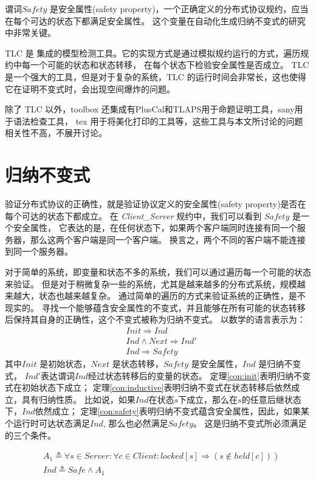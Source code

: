 谓词$Safety$ 是安全属性(safety property)，一个正确定义的分布式协议规约，应当在每个可达的状态下都满足安全属性。
这个变量在自动化生成归纳不变式的研究中非常关键。

TLC 是 \TLA 集成的模型检测工具。它的实现方式是通过模拟规约运行的方式，遍历规约中每一个可能的状态和状态转移，
在每个状态下检验安全属性是否成立。
TLC 是一个强大的工具，但是对于复杂的系统，TLC 的运行时间会非常长，这也使得它在证明不变式时，会出现空间爆炸的问题。

除了 TLC 以外，\TLA toolbox\cite{tla+toolbox} 还集成有PlusCal和TLAPS用于命题证明工具，sany用于语法检查工具，
tex 用于将\TLA 美化打印的工具等，这些工具与本文所讨论的问题相关性不高，不展开讨论。

\section{归纳不变式}
验证分布式协议的正确性，就是验证协议定义的安全属性(safety property)是否在每个可达的状态下都成立。
在 \textit{Client\_Server} 规约中，我们可以看到 $Safety$ 是一个安全属性，
它表达的是，在任何状态下，如果两个客户端同时连接有同一个服务器，那么这两个客户端是同一个客户端。
换言之，两个不同的客户端不能连接到同一个服务器。

对于简单的系统，即变量和状态不多的系统，我们可以通过遍历每一个可能的状态来验证。
但是对于稍微复杂一些的系统，尤其是越来越多的分布式系统，规模越来越大，状态也越来越复杂。
通过简单的遍历的方式来验证系统的正确性，是不现实的。
寻找一个能够蕴含安全属性的不变式，并且能够在所有可能的状态转移后保持其自身的正确性，这个不变式被称为归纳不变式。
以数学的语言表示为：
\begin{align}
    &Init \Rightarrow Ind \label{con:init}\\
    &Ind \land Next \Rightarrow Ind' \label{con:inductive}\\
    &Ind \Rightarrow Safety \label{con:safety}
\end{align}
其中$Init$ 是初始状态，$Next$ 是状态转移，$Safety$ 是安全属性，$Ind$ 是归纳不变式，
$Ind'$表达谓词$Ind$经过状态转移后的变量的状态。
定理\ref{con:init}表明归纳不变式在初始状态下成立；
定理\ref{con:inductive}表明归纳不变式在状态转移后依然成立，具有归纳性质。
比如说，如果$Ind$在状态$s$下成立，那么在$s$的任意后继状态下，$Ind$依然成立；
定理\ref{con:safety}表明归纳不变式蕴含安全属性，因此，如果某个运行时可达状态满足$Ind$, 那么也必然满足$Safety$。
这是归纳不变式所必须满足的三个条件。

\begin{align}
    &\left.A_{1} \triangleq \forall s \in  { Server }: \forall c \in  { Client }:  { locked }[s] \Rightarrow(s \notin { held }[c])\right) \\
    &{ Ind } \triangleq  { Safe } \wedge A_{1} \label{con:candidate_ind}
\end{align}

